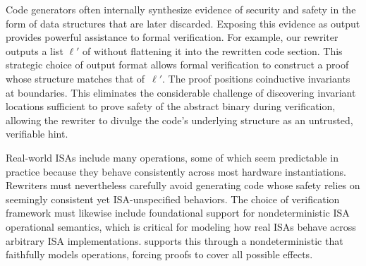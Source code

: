 
Code generators often internally synthesize evidence of security and safety in the form of data structures that are later discarded.
Exposing this evidence as output provides powerful assistance to formal verification.
For example, our rewriter outputs a list $\ell'$ of \Blocks without flattening it into the rewritten code section.
This strategic choice of output format allows formal verification to construct a proof whose structure matches that of~$\ell'$.
The proof positions coinductive invariants at \Block boundaries.
This eliminates the considerable challenge of discovering invariant locations sufficient to prove safety of the abstract binary during verification, allowing the rewriter to divulge the code's underlying structure as an untrusted, verifiable hint.


Real-world ISAs include many \unpredictable{} operations, some of which seem predictable in practice because they behave consistently across most hardware instantiations.
Rewriters must nevertheless carefully avoid generating code whose safety relies on seemingly consistent yet ISA-unspecified behaviors.
The choice of verification framework must likewise include foundational support for nondeterministic ISA operational semantics, which is critical for modeling how real ISAs behave across arbitrary ISA implementations.
\Picinae supports this through a nondeterministic \IL that faithfully models \unpredictable{} operations, forcing proofs to cover all possible effects.
